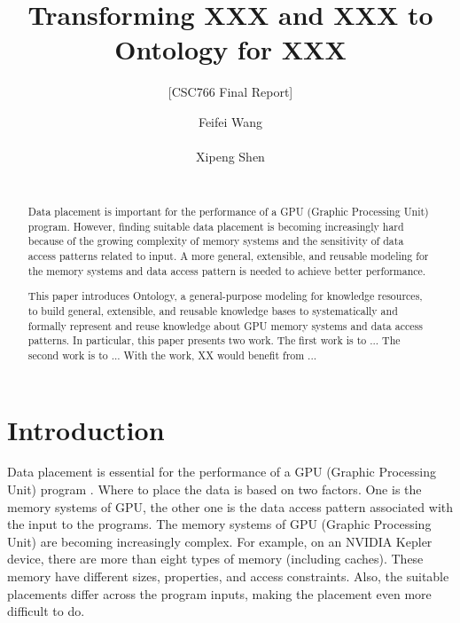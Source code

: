 \documentclass{sig-alternate}
\begin{document}

\title{Transforming XXX and XXX to Ontology for XXX}
\subtitle{[CSC766 Final Report]}

\author{
\alignauthor
Feifei Wang\\
       \\
\alignauthor
Xipeng Shen\\
       \\
}
\maketitle
\begin{abstract}
Data placement is important for the performance of a GPU (Graphic Processing Unit) program. However, finding suitable data placement is becoming increasingly hard because of the growing complexity of memory systems and the sensitivity of data access patterns related to input. A more general, extensible, and reusable modeling for the memory systems and data access pattern is needed to achieve better performance.

This paper introduces Ontology, a general-purpose modeling for knowledge resources, to build general, extensible, and reusable knowledge bases to systematically and formally represent and reuse knowledge about GPU memory systems and data access patterns. In particular, this paper presents two work. The first work is to ... The second work is to ... With the work, XX would benefit from ...
\end{abstract}



\section{Introduction}
Data placement is essential for the performance of a GPU (Graphic Processing Unit) program \cite{intro1}. Where to place the data is based on two factors. One is the memory systems of GPU, the other one is the data access pattern associated with the input to the programs. The memory systems of GPU (Graphic Processing Unit) are becoming increasingly complex. For example, on an NVIDIA Kepler device, there are more than eight types of memory (including caches). These memory have different sizes, properties, and access constraints. Also, the suitable placements differ across the program inputs, making the placement even more difficult to do.
\end{document}
